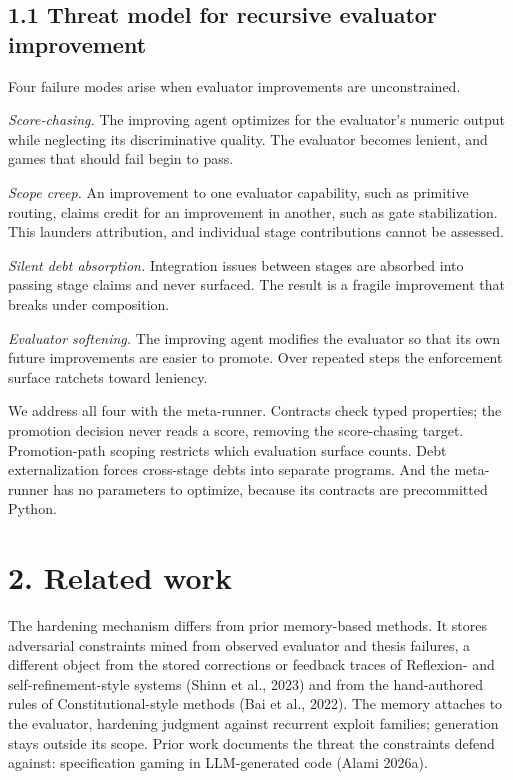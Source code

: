 \documentclass[
  11pt]{article}
\begin{document}
\subsection{1.1 Threat model for recursive evaluator
improvement}\label{threat-model-for-recursive-evaluator-improvement}

Four failure modes arise when evaluator improvements are unconstrained.

\emph{Score-chasing.} The improving agent optimizes for the evaluator's
numeric output while neglecting its discriminative quality. The
evaluator becomes lenient, and games that should fail begin to pass.

\emph{Scope creep.} An improvement to one evaluator capability, such as
primitive routing, claims credit for an improvement in another, such as
gate stabilization. This launders attribution, and individual stage
contributions cannot be assessed.

\emph{Silent debt absorption.} Integration issues between stages are
absorbed into passing stage claims and never surfaced. The result is a
fragile improvement that breaks under composition.

\emph{Evaluator softening.} The improving agent modifies the evaluator
so that its own future improvements are easier to promote. Over repeated
steps the enforcement surface ratchets toward leniency.

We address all four with the meta-runner. Contracts check typed
properties; the promotion decision never reads a score, removing the
score-chasing target. Promotion-path scoping restricts which evaluation
surface counts. Debt externalization forces cross-stage debts into
separate programs. And the meta-runner has no parameters to optimize,
because its contracts are precommitted Python.

\section{2. Related work}\label{related-work}

The hardening mechanism differs from prior memory-based methods. It
stores adversarial constraints mined from observed evaluator and thesis
failures, a different object from the stored corrections or feedback
traces of Reflexion- and self-refinement-style systems (Shinn et al.,
2023) and from the hand-authored rules of Constitutional-style methods
(Bai et al., 2022). The memory attaches to the evaluator, hardening
judgment against recurrent exploit families; generation stays outside
its scope. Prior work documents the threat the constraints defend
against: specification gaming in LLM-generated code (Alami 2026a).
\end{document}
